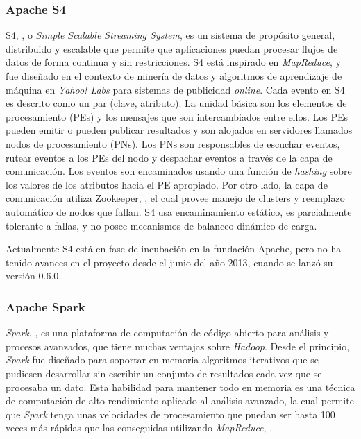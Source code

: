 \subsubsection*{Apache S4}
\label{arte:SPS:s4}
					
S4, \cite{NeumeyerS4}, o \textit{Simple Scalable Streaming System}, es un sistema de propósito general, distribuido y escalable que permite que aplicaciones puedan procesar flujos de datos de forma continua y sin restricciones. S4 está inspirado en \textit{MapReduce}, y fue diseñado en el contexto de minería de datos y algoritmos de aprendizaje de máquina en \textit{Yahoo! Labs} para sistemas de publicidad \textit{online}. Cada evento en S4 es descrito como un par (clave, atributo). La unidad básica son los elementos de procesamiento (PEs) y los mensajes que son intercambiados entre ellos. Los PEs pueden emitir o pueden publicar resultados y son alojados en servidores llamados nodos de procesamiento (PNs). Los PNs son responsables de escuchar eventos, rutear eventos a los PEs del nodo y despachar eventos a través de la capa de comunicación. Los eventos son encaminados usando una función de \textit{hashing} sobre los valores de los atributos hacia el PE apropiado. Por otro lado, la capa de comunicación utiliza Zookeeper, \cite{HuntZookeeper}, el cual provee manejo de clusters y reemplazo automático de nodos que fallan. S4 usa encaminamiento estático, es parcialmente tolerante a fallas, y no posee mecanismos de balanceo dinámico de carga.
					
Actualmente S4 está en fase de incubación en la fundación Apache, pero no ha tenido avances en el proyecto desde el junio del año 2013, cuando se lanzó su versión 0.6.0.

\subsubsection*{Apache Spark}
\label{arte:SPS:spark}

\textit{Spark}, \cite{SparkOnline}, es una plataforma de computación de código abierto para análisis y procesos avanzados, que tiene muchas ventajas sobre \textit{Hadoop}. Desde el principio, \textit{Spark} fue diseñado para soportar en memoria algoritmos iterativos que se pudiesen desarrollar sin escribir un conjunto de resultados cada vez que se procesaba un dato. Esta habilidad para mantener todo en memoria es una técnica de computación de alto rendimiento aplicado al análisis avanzado, la cual permite que \textit{Spark} tenga unas velocidades de procesamiento que puedan ser hasta 100 veces más rápidas que las conseguidas utilizando \textit{MapReduce}, \cite{Spark}.

